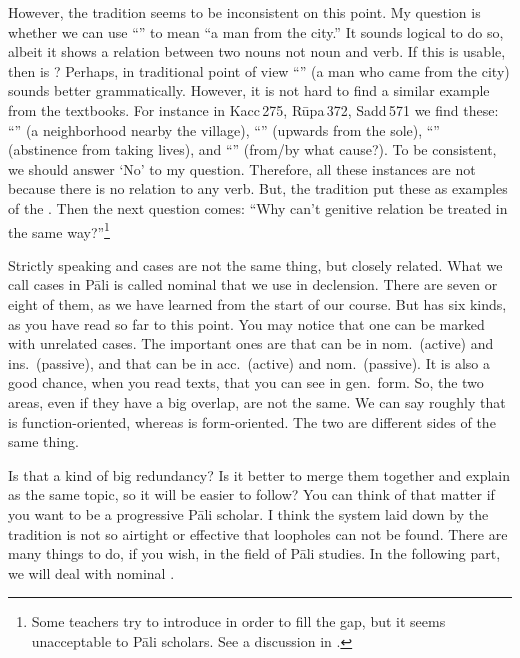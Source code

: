 However, the tradition seems to be inconsistent on this point. My question is whether we can use ``'' to mean ``a man from the city.'' It sounds logical to do so, albeit it shows a relation between two nouns not noun and verb. If this is usable, then is  ? Perhaps, in traditional point of view ``'' (a man who came from the city) sounds better grammatically. However, it is not hard to find a similar example from the textbooks. For instance in Kacc\,275, R\=upa\,372, Sadd\,571 we find these: ``'' (a neighborhood nearby the village), ``'' (upwards from the sole), ``'' (abstinence from taking lives), and ``'' (from/by what cause?). To be consistent, we should answer `No' to my question. Therefore, all these instances are not  because there is no relation to any verb. But, the tradition put these as examples of the . Then the next question comes: ``Why can't genitive relation be treated in the same way?''\footnote{Some teachers try to introduce  in order to fill the gap, but it seems unacceptable to P\=ali scholars. See a discussion in \citealp[pp.~304--5]{supaphan:pali}.}

Strictly speaking  and cases are not the same thing, but closely related. What we call cases in P\=ali is called nominal  that we use in declension. There are seven or eight of them, as we have learned from the start of our course. But  has six kinds, as you have read so far to this point. You may notice that one  can be marked with unrelated cases. The important ones are  that can be in nom.\ (active) and ins.\ (passive), and  that can be in acc.\ (active) and nom.\ (passive). It is also a good chance, when you read texts, that you can see  in gen.\ form. So, the two areas, even if they have a big overlap, are not the same. We can say roughly that  is function-oriented, whereas  is form-oriented. The two are different sides of the same thing.

Is that a kind of big redundancy? Is it better to merge them together and explain as the same topic, so it will be easier to follow? You can think of that matter if you want to be a progressive P\=ali scholar. I think the system laid down by the tradition is not so airtight or effective that loopholes can not be found. There are many things to do, if you wish, in the field of P\=ali studies. In the following part, we will deal with nominal .

